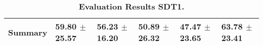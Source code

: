\begin{table}[htb]
{\begin{tabular}{llllll}
\midrule
\textbf{Summary                                  } &                  \phantom{0}59.80 $\pm$ 25.57 &                      \phantom{0}56.23 $\pm$ 16.20 &                  \phantom{0}50.89 $\pm$ 26.32 &            \phantom{0}47.47 $\pm$ 23.65 &            \phantom{0}63.78 $\pm$ 23.41 \\
\bottomrule
\end{tabular}%
}
\caption{\textbf{Evaluation Results SDT1.}}
\label{tab:eval-results}
\end{table}


